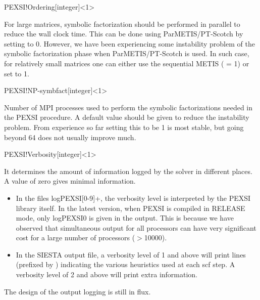 \begin{fdfentry}{PEXSI!Ordering}[integer]<1>

  For large matrices, symbolic factorization should be performed in
  parallel to reduce the wall clock time.  This can be done using
  ParMETIS/PT-Scotch by setting  to 0.  However,
  we have been experiencing some instability problem of the symbolic
  factorization phase when ParMETIS/PT-Scotch is used.  In such case,
  for relatively small matrices one can either use the sequential
  METIS ( = 1) or set  to
  1.
  
\end{fdfentry}


\begin{fdfentry}{PEXSI!NP-symbfact}[integer]<1>

  Number of MPI processes used to perform the symbolic factorizations
  needed in the PEXSI procedure.  A default value should be given to
  reduce the instability problem.  From experience so far setting this
  to be 1 is most stable, but going beyond 64 does not usually improve
  much.

\end{fdfentry}

\begin{fdfentry}{PEXSI!Verbosity}[integer]<1>

  It determines the amount of information logged by the solver in
  different places. A value of zero gives minimal information.
  \begin{itemize}

    \item%
    In the files logPEXSI[0-9]+, the verbosity level is interpreted by
    the PEXSI library itself. In the latest version, when PEXSI is
    compiled in RELEASE mode, only logPEXSI0 is given in the output.
    This is because we have observed that simultaneous output for all
    processors can have very significant cost for a large number of
    processors ($>$10000).  

    \item%
    In the SIESTA output file, a verbosity level of 1 and above will
    print lines (prefixed by ) indicating the various heuristics
    used at each scf step. A verbosity level of 2 and above will print
    extra information.

  \end{itemize}
  The design of the output logging is still in flux.
  
\end{fdfentry}

